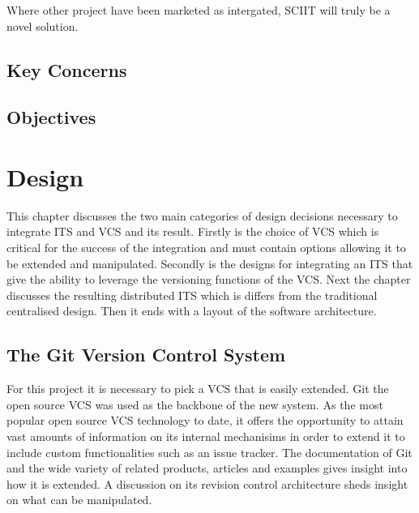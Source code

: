 \documentclass{mproj}
\begin{document}
Where other project have been marketed as intergated, SCIIT will truly be a novel solution. 

\section{Key Concerns}


\section{Objectives}


\chapter{Design}\label{design}

This chapter discusses the two main categories of design decisions necessary to integrate ITS and VCS and its result. Firstly is the choice of VCS which is critical for the success of the integration and must contain options allowing it to be extended and manipulated. Secondly is the designs for integrating an ITS that give the ability to leverage the versioning functions of the VCS. Next the chapter discusses the resulting distributed ITS which is differs from the traditional centralised design. Then it ends with a layout of the software architecture.




\section{The Git Version Control System}

For this project it is necessary to pick a VCS that is easily extended. Git the open source VCS was used as the backbone of the new system. As the most popular open source VCS  technology to date, it offers the opportunity to attain vast amounts of information on its internal mechanisims in order to extend it to include custom functionalities such as an issue tracker. The documentation of Git and the wide variety of related products, articles and examples gives insight into how it is extended. A discussion on its revision control architecture sheds insight on what can be manipulated.



\end{document}
